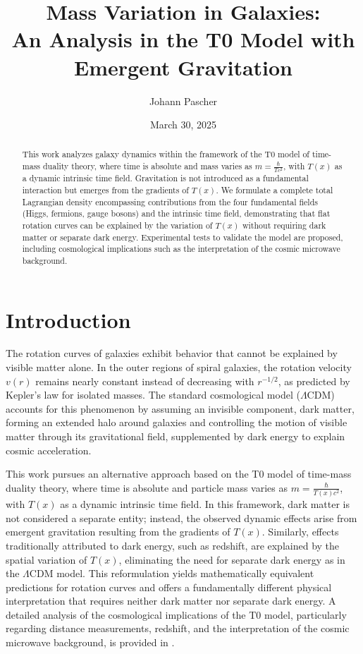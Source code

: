 \documentclass[12pt,a4paper]{article}
\title{Mass Variation in Galaxies: \\An Analysis in the T0 Model with Emergent Gravitation}
\author{Johann Pascher}
\date{March 30, 2025}
\newcommand{\Tfield}{T(x)}
\begin{document}
	
	\maketitle
	
	\begin{abstract}
		This work analyzes galaxy dynamics within the framework of the T0 model of time-mass duality theory, where time is absolute and mass varies as \( m = \frac{\hbar}{T c^2} \), with \( \Tfield \) as a dynamic intrinsic time field. Gravitation is not introduced as a fundamental interaction but emerges from the gradients of \( \Tfield \). We formulate a complete total Lagrangian density encompassing contributions from the four fundamental fields (Higgs, fermions, gauge bosons) and the intrinsic time field, demonstrating that flat rotation curves can be explained by the variation of \( \Tfield \) without requiring dark matter or separate dark energy. Experimental tests to validate the model are proposed, including cosmological implications such as the interpretation of the cosmic microwave background.
	\end{abstract}
	
	\tableofcontents
	\newpage
	
	\section{Introduction}
	The rotation curves of galaxies exhibit behavior that cannot be explained by visible matter alone. In the outer regions of spiral galaxies, the rotation velocity \( v(r) \) remains nearly constant instead of decreasing with \( r^{-1/2} \), as predicted by Kepler’s law for isolated masses. The standard cosmological model (\(\Lambda\)CDM) accounts for this phenomenon by assuming an invisible component, dark matter, forming an extended halo around galaxies and controlling the motion of visible matter through its gravitational field, supplemented by dark energy to explain cosmic acceleration.
	
	This work pursues an alternative approach based on the T0 model of time-mass duality theory, where time is absolute and particle mass varies as \( m = \frac{\hbar}{\Tfield c^2} \), with \( \Tfield \) as a dynamic intrinsic time field. In this framework, dark matter is not considered a separate entity; instead, the observed dynamic effects arise from emergent gravitation resulting from the gradients of \( \Tfield \). Similarly, effects traditionally attributed to dark energy, such as redshift, are explained by the spatial variation of \( \Tfield \), eliminating the need for separate dark energy as in the \(\Lambda\)CDM model. This reformulation yields mathematically equivalent predictions for rotation curves and offers a fundamentally different physical interpretation that requires neither dark matter nor separate dark energy. A detailed analysis of the cosmological implications of the T0 model, particularly regarding distance measurements, redshift, and the interpretation of the cosmic microwave background, is provided in \cite{pascher_messdifferenzen_2025}.
	
\end{document}
